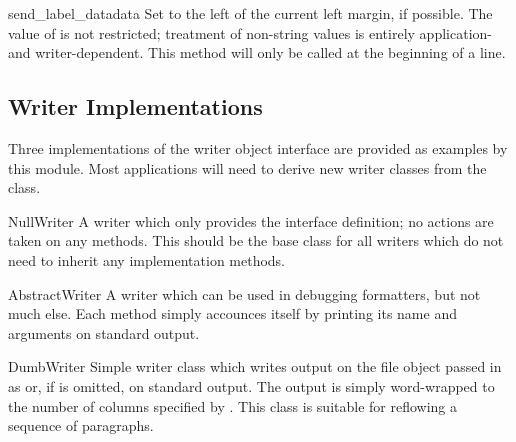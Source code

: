 \begin{funcdesc}{send_label_data}{data}
Set  to the left of the current left margin, if possible.
The value of  is not restricted; treatment of non-string
values is entirely application- and writer-dependent.  This method
will only be called at the beginning of a line.
\end{funcdesc}


\subsection{Writer Implementations}

Three implementations of the writer object interface are provided as
examples by this module.  Most applications will need to derive new
writer classes from the  class.

\renewcommand{\indexsubitem}{(in module formatter)}

\begin{funcdesc}{NullWriter}{}
A writer which only provides the interface definition; no actions are
taken on any methods.  This should be the base class for all writers
which do not need to inherit any implementation methods.
\end{funcdesc}

\begin{funcdesc}{AbstractWriter}{}
A writer which can be used in debugging formatters, but not much
else.  Each method simply accounces itself by printing its name and
arguments on standard output.
\end{funcdesc}

\begin{funcdesc}{DumbWriter}{}
Simple writer class which writes output on the file object passed in
as  or, if  is omitted, on standard output.  The
output is simply word-wrapped to the number of columns specified by
.  This class is suitable for reflowing a sequence of
paragraphs.
\end{funcdesc}
